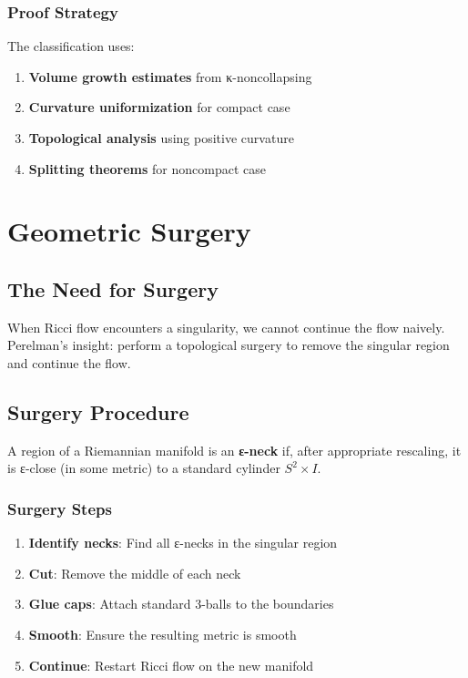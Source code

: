 \subsection{Proof Strategy}

The classification uses:
\begin{enumerate}
\item \textbf{Volume growth estimates} from κ-noncollapsing
\item \textbf{Curvature uniformization} for compact case
\item \textbf{Topological analysis} using positive curvature
\item \textbf{Splitting theorems} for noncompact case
\end{enumerate}

\chapter{Geometric Surgery}
\label{chap:surgery}

\section{The Need for Surgery}

When Ricci flow encounters a singularity, we cannot continue the flow naively. Perelman's insight: perform a topological surgery to remove the singular region and continue the flow.

\section{Surgery Procedure}

\begin{definition}[ε-Neck]
\label{def:epsilon_neck}
\leanok
{}
A region of a Riemannian manifold is an \textbf{ε-neck} if, after appropriate rescaling, it is ε-close (in some metric) to a standard cylinder $S^2 \times I$.
\end{definition}

\subsection{Surgery Steps}

\begin{enumerate}
\item \textbf{Identify necks}: Find all ε-necks in the singular region
\item \textbf{Cut}: Remove the middle of each neck
\item \textbf{Glue caps}: Attach standard 3-balls to the boundaries
\item \textbf{Smooth}: Ensure the resulting metric is smooth
\item \textbf{Continue}: Restart Ricci flow on the new manifold
\end{enumerate}


